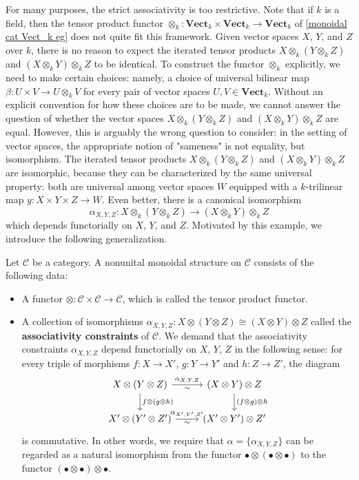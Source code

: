 For many purposes, the strict associativity is too restrictive. Note that if $k$ is a field, then the tensor product functor $\otimes_k:\mathbf{Vect}_k\times\mathbf{Vect}_k\to\mathbf{Vect}_k$ of \cref{monoidal cat Vect_k eg} does not quite fit this framework. Given vector spaces $X$, $Y$, and $Z$ over $k$, there is no reason to expect the iterated tensor products $X\otimes_k(Y\otimes_kZ)$ and $(X\otimes_kY)\otimes_kZ$ to be identical. To construct the functor $\otimes_k$ explicitly, we need to make certain choices: namely, a choice of universal bilinear map $\beta:U\times V\to U\otimes_kV$ for every pair of vector spaces $U,V\in\mathbf{Vect}_k$. Without an explicit convention for how these choices are to be made, we cannot answer the question of whether the vector spaces $X\otimes_k(Y\otimes_kZ)$ and $(X\otimes_kY)\otimes_kZ$ are equal. However, this is arguably the wrong question to consider: in the setting of vector spaces, the appropriate notion of "sameness" is not equality, but isomorphism. The iterated tensor products $X\otimes_k(Y\otimes_kZ)$ and $(X\otimes_kY)\otimes_kZ$ are isomorphic, because they can be characterized by the same universal property: both are universal among vector spaces $W$ equipped with a $k$-trilinear map $y:X\times Y\times Z\to W$. Even better, there is a canonical isomorphism
\[\alpha_{X,Y,Z}:X\otimes_k(Y\otimes_kZ)\to(X\otimes_kY)\otimes_kZ\]
which depends functorially on $X$, $Y$, and $Z$. Motivated by this example, we introduce the following generalization.\par
Let $\mathcal{C}$ be a category. A nonunital monoidal structure on $\mathcal{C}$ consists of the following data:
\begin{itemize}
\item A functor $\otimes:\mathcal{C}\times\mathcal{C}\to\mathcal{C}$, which is called the tensor product functor.
\item A collection of isomorphisms $\alpha_{X,Y,Z}:X\otimes(Y\otimes Z)\cong(X\otimes Y)\otimes Z$ called the \textbf{associativity constraints} of $\mathcal{C}$. We demand that the associativity constraints $\alpha_{X,Y,Z}$ depend functorially on $X$, $Y$, $Z$ in the following sense: for every triple of morphisms $f:X\to X'$, $g:Y\to Y'$ and $h:Z\to Z'$, the diagram
\[\begin{tikzcd}
X\otimes(Y\otimes Z)\ar[r,"\alpha_{X,Y,Z}","\sim"']\ar[d,"f\otimes(g\otimes h)"]&(X\otimes Y)\otimes Z\ar[d,"(f\otimes g)\otimes h"]\\
X'\otimes(Y'\otimes Z')\ar[r,"\alpha_{X',Y',Z'}","\sim"']&(X'\otimes Y')\otimes Z'
\end{tikzcd}\]
is commutative. In other words, we require that $\alpha=\{\alpha_{X,Y,Z}\}$ can be regarded as a natural isomorphism from the functor $\bullet\otimes(\bullet\otimes\bullet)$ to the functor $(\bullet\otimes\bullet)\otimes\bullet$.
\end{itemize}

